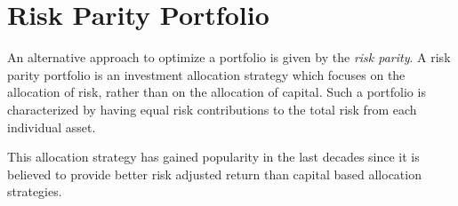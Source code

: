 %
%

%

\section{Risk Parity Portfolio}
\label{risk-parity-portfolio}

An alternative approach to optimize a portfolio is given by the \emph{risk parity}. A risk parity portfolio is an investment allocation strategy which focuses on the allocation of risk, rather than on the allocation of capital.
Such a portfolio is characterized by having equal risk contributions to the total risk from each individual asset.

This allocation strategy has gained popularity in the last decades since it is believed to provide better risk adjusted return than capital based allocation strategies.


